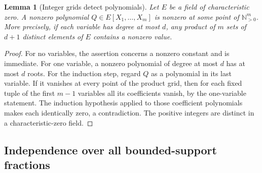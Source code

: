 \documentclass[11pt,letterpaper]{article}
\newtheorem{lemma}[theorem]{Lemma}
\theoremstyle{definition}
\theoremstyle{remark}
\newcommand{\N}{\mathbb N}
\begin{document}
\begin{lemma}[Integer grids detect polynomials]\label{bst:lem:grid}
Let $E$ be a field of characteristic zero. A nonzero polynomial
$Q\in E[X_1,\ldots,X_m]$ is nonzero at some point of $\N_{>0}^m$.
More precisely, if each variable has degree at most $d$, any product of
$m$ sets of $d+1$ distinct elements of $E$ contains a nonzero value.
\end{lemma}
\begin{proof}
For no variables, the assertion concerns a nonzero constant and is immediate.
For one variable, a nonzero polynomial of degree at most $d$ has at most
$d$ roots. For the induction step, regard $Q$ as a polynomial in its last
variable. If it vanishes at every point of the product grid, then for each
fixed tuple of the first $m-1$ variables all its coefficients vanish, by
the one-variable statement. The induction hypothesis applied to those
coefficient polynomials makes each identically zero, a contradiction.
The positive integers are distinct in a characteristic-zero field.
\end{proof}

\subsection{Independence over all bounded-support fractions}
\end{document}
